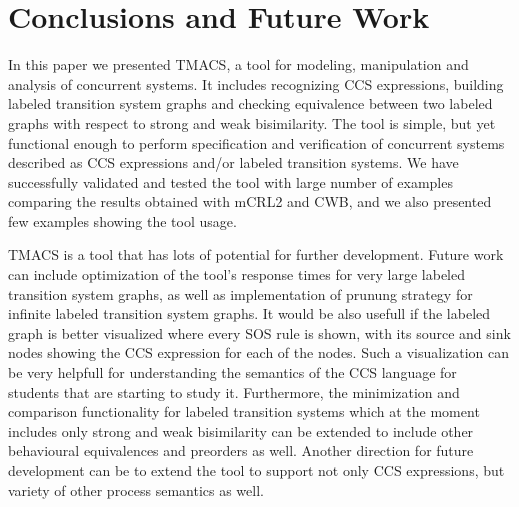 \section{Conclusions and Future Work}
\label{sec:conclusion}

In this paper we presented TMACS, a tool for modeling, manipulation and analysis of concurrent systems. It includes recognizing CCS expressions, building labeled transition system graphs and checking equivalence between two labeled graphs with respect to strong and weak bisimilarity. The tool is simple, but yet functional enough to perform specification and verification of concurrent systems described as CCS expressions and/or labeled transition systems. We have successfully validated and tested the tool with large number of examples comparing the results obtained with mCRL2 and CWB, and we also presented few examples showing the tool usage. 

TMACS is a tool that has lots of potential for further development. Future work can include optimization of the tool's response times for very large labeled transition system graphs, as well as implementation of prunung strategy for infinite labeled transition system graphs. It would be also usefull if the labeled graph is better visualized where every SOS rule is shown, with its source and sink nodes showing the CCS expression for each of the nodes. Such a visualization can be very helpfull for understanding the semantics of the CCS language for students that are starting to study it. Furthermore, the minimization and comparison functionality for labeled transition systems which at the moment includes only strong and weak bisimilarity can be extended to include other behavioural equivalences and preorders as well. Another direction for future development can be to extend the tool to support not only CCS expressions, but variety of other process semantics as well. 